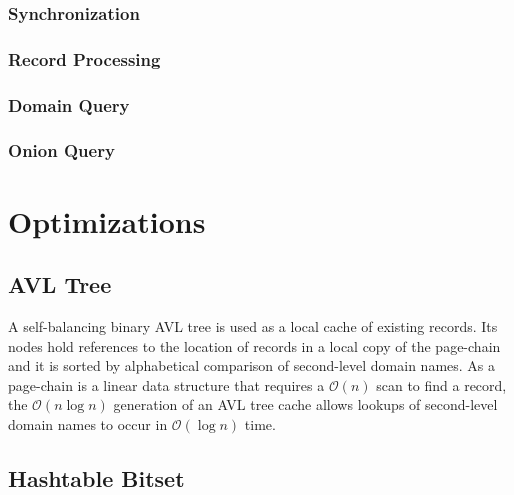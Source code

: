 \subsubsection{Synchronization}

\subsubsection{Record Processing}

\subsubsection{Domain Query}

\subsubsection{Onion Query}







\section{Optimizations}

\subsection{AVL Tree}
\label{sec:AVLTree}

A self-balancing binary AVL tree is used as a local cache of existing records. Its nodes hold references to the location of records in a local copy of the page-chain and it is sorted by alphabetical comparison of second-level domain names. As a page-chain is a linear data structure that requires a $ \mathcal{O}(n) $ scan to find a record, the $ \mathcal{O}(n\log{}n) $ generation of an AVL tree cache allows lookups of second-level domain names to occur in $ \mathcal{O}(\log{}n) $ time.





\subsection{Hashtable Bitset}

